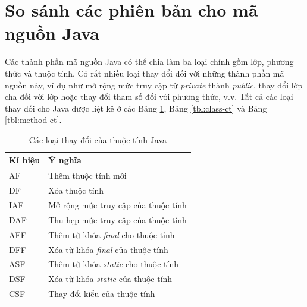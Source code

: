 \documentclass[12pt]{report}
\begin{document}
\section{So sánh các phiên bản cho mã nguồn Java}
Các thành phần mã nguồn Java có thể chia làm ba loại chính gồm lớp, phương thức và thuộc tính. Có rất nhiều loại thay đổi đối với những thành phần mã nguồn này, ví dụ như mở rộng mức truy cập từ \textit{private} thành \textit{public}, thay đổi lớp cha đối với lớp hoặc thay đổi tham số đối với phương thức, v.v. Tất cả các loại thay đổi cho Java được liệt kê ở các Bảng \ref{tbl:attribute-ct}, Bảng \ref{tbl:class-ct} và Bảng \ref{tbl:method-ct}.


\begin{table}[h]
	\centering
	\caption{Các loại thay đổi của thuộc tính Java}
	\label{tbl:attribute-ct}
	\begin{tabular}{|l|l|}
		\hline
		\textbf{Kí hiệu} & \textbf{Ý nghĩa}                                        \\ \hline
		AF               & Thêm thuộc tính mới                                            \\ \hline
		DF               & Xóa thuộc tính                                                 \\ \hline
		IAF              & Mở rộng mức truy cập của thuộc tính                            \\ \hline
		DAF              & Thu hẹp mức truy cập của thuộc tính                            \\ \hline
		AFF              & Thêm từ khóa \textit{final} cho thuộc tính    \\ \hline
		DFF              & Xóa từ khóa \textit{final} của thuộc tính     \\ \hline
		ASF              & Thêm từ khóa \textit{static} cho thuộc tính   \\ \hline
		DSF              & Xóa từ khóa \textit{static} của thuộc tính    \\ \hline
		CSF              & Thay đổi kiểu của thuộc tính    \\ \hline
	\end{tabular}
\end{table}
\end{document}
